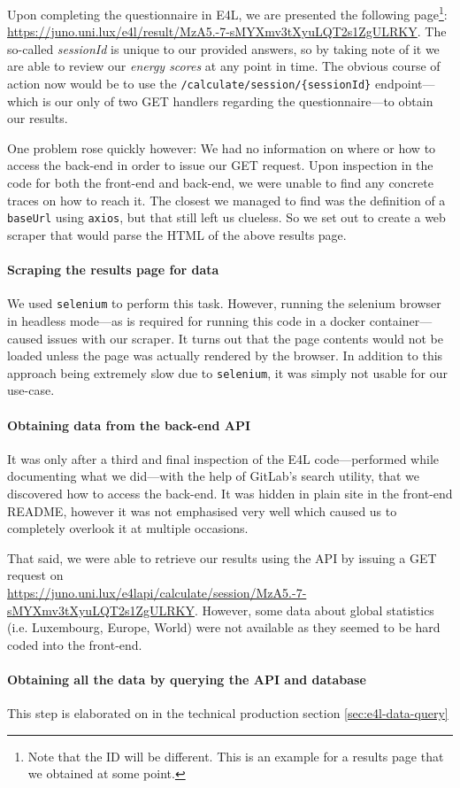 Upon completing the questionnaire in E4L, we are presented the
following page\footnote{Note that the ID will be different. This is an
example for a results page that we obtained at some point.}:
\url{https://juno.uni.lux/e4l/result/MzA5.-7-sMYXmv3tXyuLQT2s1ZgULRKY}.
The so-called	\textit{sessionId} is unique to our provided answers, so
by taking note of it we are able to review our \textit{energy scores}
at any point in time. The obvious course of action now would be to use
the \verb|/calculate/session/{sessionId}| endpoint---which is our only
of two GET handlers regarding the questionnaire---to obtain our
results.

One problem rose quickly however: We had no information on where or
how to access the back-end in order to issue our GET request. Upon
inspection in the code for both the front-end and back-end, we were
unable to find any concrete traces on how to reach it. The closest we
managed to find was the definition of a \verb|baseUrl| using \verb|axios|,
but that still left us clueless. So we set out to create a web scraper
that would parse the HTML of the above results page.

\paragraph{Scraping the results page for data}

We used \verb|selenium| to perform this task. However, running the
selenium browser in headless mode---as is required for running this
code in a docker container---caused issues with our scraper. It turns
out that the page contents would not be loaded unless the page was
actually rendered by the browser. In addition to this approach being
extremely slow due to \verb|selenium|, it was simply not usable for
our use-case.

\paragraph{Obtaining data from the back-end API}

It was only after a third and final inspection of the E4L
code---performed while documenting what we did---with the help of
GitLab's search utility, that we discovered how to access the
back-end.  It was hidden in plain site in the front-end README,
however it was not emphasised very well which caused us to completely
overlook it at multiple occasions.

That said, we were able to retrieve our results using the API by
issuing a GET request on
\\\url{https://juno.uni.lux/e4lapi/calculate/session/MzA5.-7-sMYXmv3tXyuLQT2s1ZgULRKY}.
However, some data about global statistics (i.e. Luxembourg, Europe,
World) were not available as they seemed to be hard coded into the
front-end.

\paragraph{Obtaining all the data by querying the API and database}

This step is elaborated on in the technical production section
\ref{sec:e4l-data-query}
